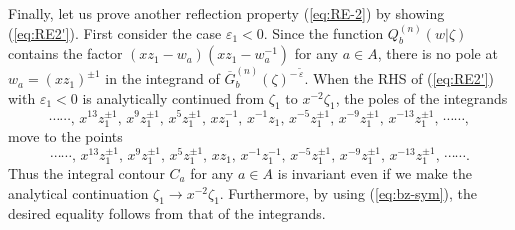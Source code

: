 \documentclass[a4paper,10pt]{article}
\begin{document}
{Finally, let us prove another reflection property 
(\ref{eq:RE-2}) by showing (\ref{eq:RE2'}). 
First consider the case $\varepsilon_{1}<0$. Since the 
function $Q_b^{(n)}(w|\zeta)$ contains the factor 
$(xz_1 -w_a )(xz_1 -w_a^{-1})$ for any $a\in A$, there 
is no pole at $w_a =(xz_1 )^{\pm 1}$ in the integrand of 
$\overline{G}_{b}^{(n)} (\zeta)^{-\,\tilde{\varepsilon}}$. 
When the RHS of (\ref{eq:RE2'}) with $\varepsilon_{1}<0$ 
is analytically continued from $\zeta_{1}$ to 
$x^{-2}\zeta_{1}$, the poles of the integrands 
$$
\cdots\cdots, \, x^{13} z_{1}^{\pm 1}, \, 
x^9 z_{1}^{\pm 1}, \, x^5 z_{1}^{\pm 1}, \, 
x z_{1}^{-1}, \, x^{-1}z_{1}, 
\, x^{-5}z_{1}^{\pm 1}, \, x^{-9}z_{1}^{\pm 1}, \, 
x^{-13}z_{1}^{\pm 1}, \, \cdots\cdots , 
$$ 
move to the points 
$$
\cdots\cdots, \, x^{13} z_{1}^{\pm 1}, \, 
x^9 z_{1}^{\pm 1}, \, x^5 z_{1}^{\pm 1}, \, 
x z_{1}, \, x^{-1}z_{1}^{-1}, 
\, x^{-5}z_{1}^{\pm 1}, \, x^{-9}z_{1}^{\pm 1}, \, 
x^{-13}z_{1}^{\pm 1}, \, \cdots\cdots . 
$$ 
Thus the integral contour $C_a$ for any $a\in A$ is invariant 
even if we make the analytical continuation 
$\zeta_1 \rightarrow x^{-2}\zeta_1$. Furthermore, 
by using (\ref{eq:bz-sym}), the desired equality 
follows from that of the integrands. 

}
\end{document}
